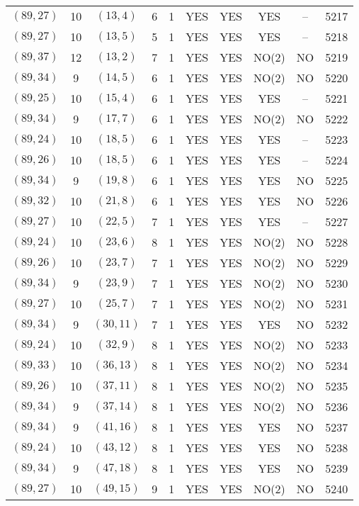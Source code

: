 \begin{longtable}{|c|c|c|c|c|c|c|c|c|c|}
$(89, 27)$ & 10 & $(13, 4)$ & 6 & 1 & YES & YES & YES & -- & 5217\\
$(89, 27)$ & 10 & $(13, 5)$ & 5 & 1 & YES & YES & YES & -- & 5218\\
$(89, 37)$ & 12 & $(13, 2)$ & 7 & 1 & YES & YES & NO(2) & NO & 5219\\
$(89, 34)$ & 9 & $(14, 5)$ & 6 & 1 & YES & YES & NO(2) & NO & 5220\\
$(89, 25)$ & 10 & $(15, 4)$ & 6 & 1 & YES & YES & YES & -- & 5221\\
$(89, 34)$ & 9 & $(17, 7)$ & 6 & 1 & YES & YES & NO(2) & NO & 5222\\
$(89, 24)$ & 10 & $(18, 5)$ & 6 & 1 & YES & YES & YES & -- & 5223\\
$(89, 26)$ & 10 & $(18, 5)$ & 6 & 1 & YES & YES & YES & -- & 5224\\
$(89, 34)$ & 9 & $(19, 8)$ & 6 & 1 & YES & YES & YES & NO & 5225\\
$(89, 32)$ & 10 & $(21, 8)$ & 6 & 1 & YES & YES & YES & NO & 5226\\
$(89, 27)$ & 10 & $(22, 5)$ & 7 & 1 & YES & YES & YES & -- & 5227\\
$(89, 24)$ & 10 & $(23, 6)$ & 8 & 1 & YES & YES & NO(2) & NO & 5228\\
$(89, 26)$ & 10 & $(23, 7)$ & 7 & 1 & YES & YES & NO(2) & NO & 5229\\
$(89, 34)$ & 9 & $(23, 9)$ & 7 & 1 & YES & YES & NO(2) & NO & 5230\\
$(89, 27)$ & 10 & $(25, 7)$ & 7 & 1 & YES & YES & NO(2) & NO & 5231\\
$(89, 34)$ & 9 & $(30, 11)$ & 7 & 1 & YES & YES & YES & NO & 5232\\
$(89, 24)$ & 10 & $(32, 9)$ & 8 & 1 & YES & YES & NO(2) & NO & 5233\\
$(89, 33)$ & 10 & $(36, 13)$ & 8 & 1 & YES & YES & NO(2) & NO & 5234\\
$(89, 26)$ & 10 & $(37, 11)$ & 8 & 1 & YES & YES & NO(2) & NO & 5235\\
$(89, 34)$ & 9 & $(37, 14)$ & 8 & 1 & YES & YES & NO(2) & NO & 5236\\
$(89, 34)$ & 9 & $(41, 16)$ & 8 & 1 & YES & YES & YES & NO & 5237\\
$(89, 24)$ & 10 & $(43, 12)$ & 8 & 1 & YES & YES & YES & NO & 5238\\
$(89, 34)$ & 9 & $(47, 18)$ & 8 & 1 & YES & YES & YES & NO & 5239\\
$(89, 27)$ & 10 & $(49, 15)$ & 9 & 1 & YES & YES & NO(2) & NO & 5240\\

\end{longtable}
